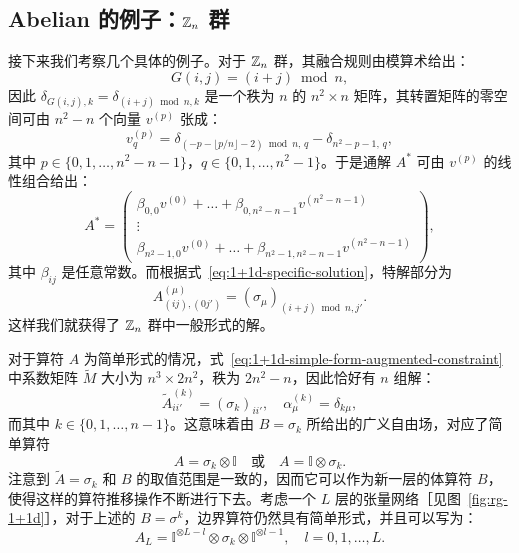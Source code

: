 \subsection{Abelian 的例子：\texorpdfstring{$\mathbb{Z}_n$}{ℤₙ} 群}

接下来我们考察几个具体的例子。对于 $\mathbb{Z}_n$ 群，其融合规则由模算术给出：
\begin{equation}
  G(i,j) = (i+j)\bmod n,
  \label{eq:zn-fusion-rules}
\end{equation}
因此 $\delta_{G(i,j),k}=\delta_{(i+j)\bmod n,k}$ 是一个秩为 $n$ 的 $n^2\times n$ 矩阵，其转置矩阵的零空间可由 $n^2-n$ 个向量 $v^{(p)}$ 张成：
\begin{equation}
  v^{(p)}_q = \delta_{(-p-\lfloor p/n\rfloor-2)\bmod n, \, q} - \delta_{n^2-p-1, \, q},
\end{equation}
其中 $p\in\{0,1,\dots,n^2-n-1\}$，$q\in\{0,1,\dots,n^2-1\}$。于是通解 $A^*$ 可由 $v^{(p)}$ 的线性组合给出：
\begin{equation}
  A^* = \begin{pmatrix}
    \beta_{0,0} v^{(0)} + \dots + \beta_{0,n^2-n-1} v^{(n^2-n-1)} \\
    \vdots \\
    \beta_{n^2-1,0} v^{(0)} + \dots + \beta_{n^2-1,n^2-n-1} v^{(n^2-n-1)}
  \end{pmatrix},
\end{equation}
其中 $\beta_{ij}$ 是任意常数。而根据式~\eqref{eq:1+1d-specific-solution}，特解部分为
\begin{equation}
  A^{(\mu)}_{(ij), (0j')} = (\sigma_\mu)_{(i+j)\bmod n, j'}.
\end{equation}
这样我们就获得了 $\mathbb{Z}_n$ 群中一般形式的解。

对于算符 $A$ 为简单形式的情况，式~\eqref{eq:1+1d-simple-form-augmented-constraint} 中系数矩阵 $\tilde{M}$ 大小为 $n^3\times2n^2$，秩为 $2n^2-n$，因此恰好有 $n$ 组解：
\begin{equation}
  \tilde{A}^{(k)}_{ii'} = (\sigma_k)_{ii'}, \quad
  \alpha^{(k)}_\mu = \delta_{k\mu},
\end{equation}
而其中 $k\in\{0,1,\dots,n-1\}$。这意味着由 $B=\sigma_k$ 所给出的广义自由场，对应了简单算符
\begin{equation}
  A = \sigma_k   \otimes \mathbb{I} \quad \text{或} \quad
  A = \mathbb{I} \otimes \sigma_k.
  \label{eq:1+1d-zn-solution}
\end{equation}
注意到 $\tilde{A}=\sigma_k$ 和 $B$ 的取值范围是一致的，因而它可以作为新一层的体算符 $B$，使得这样的算符推移操作不断进行下去。考虑一个 $L$ 层的张量网络［见图~\ref{fig:rg-1+1d}］，对于上述的 $B=\sigma^k$，边界算符仍然具有简单形式，并且可以写为：
\begin{equation}
  A_L = \mathbb{I}^{\otimes L-l} \otimes \sigma_k \otimes \mathbb{I}^{\otimes l-1}, \quad l = 0,1,\dots,L.
\end{equation}

